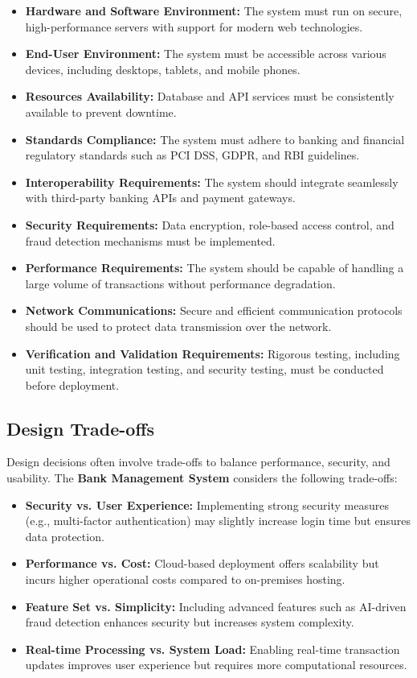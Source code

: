\begin{itemize}
\item
  \textbf{Hardware and Software Environment:} The system must run on
  secure, high-performance servers with support for modern web
  technologies.
\item
  \textbf{End-User Environment:} The system must be accessible across
  various devices, including desktops, tablets, and mobile phones.
\item
  \textbf{Resources Availability:} Database and API services must be
  consistently available to prevent downtime.
\item
  \textbf{Standards Compliance:} The system must adhere to banking and
  financial regulatory standards such as PCI DSS, GDPR, and RBI
  guidelines.
\item
  \textbf{Interoperability Requirements:} The system should integrate
  seamlessly with third-party banking APIs and payment gateways.
\item
  \textbf{Security Requirements:} Data encryption, role-based access
  control, and fraud detection mechanisms must be implemented.
\item
  \textbf{Performance Requirements:} The system should be capable of
  handling a large volume of transactions without performance
  degradation.
\item
  \textbf{Network Communications:} Secure and efficient communication
  protocols should be used to protect data transmission over the
  network.
\item
  \textbf{Verification and Validation Requirements:} Rigorous testing,
  including unit testing, integration testing, and security testing,
  must be conducted before deployment.
\end{itemize}

\subsection{Design Trade-offs}\label{design-trade-offs}

Design decisions often involve trade-offs to balance performance,
security, and usability. The \textbf{Bank Management System} considers
the following trade-offs:

\begin{itemize}
\item
  \textbf{Security vs. User Experience:} Implementing strong security
  measures (e.g., multi-factor authentication) may slightly increase
  login time but ensures data protection.
\item
  \textbf{Performance vs. Cost:} Cloud-based deployment offers
  scalability but incurs higher operational costs compared to
  on-premises hosting.
\item
  \textbf{Feature Set vs. Simplicity:} Including advanced features such
  as AI-driven fraud detection enhances security but increases system
  complexity.
\item
  \textbf{Real-time Processing vs. System Load:} Enabling real-time
  transaction updates improves user experience but requires more
  computational resources.
\end{itemize}

